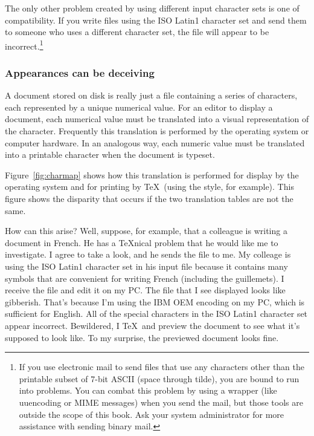 The only other problem created by using different input character sets is one
of compatibility.  If you write files using the ISO Latin1 character set and
send
them to someone who uses a different character set, the 
file will appear to be incorrect.\footnote{If you use electronic mail 
to send files that use any 
characters other than the printable subset of 7-bit ASCII (space through
tilde),
you are bound to run into problems.  You can combat
this problem by using a wrapper (like uuencoding or MIME messages) when you
send the mail, but those tools are outside the scope of this book.  Ask your
system administrator for more assistance with sending binary mail.}  

\subsubsection{Appearances can be deceiving}

A document stored on disk is really just a file containing a series of
characters, each represented by a unique numerical value.  For
an editor to display a document, each numerical value must
be translated into a visual representation of the character.  Frequently
this translation is performed by the operating system or computer hardware.
In an analogous way, each numeric value must be translated into a printable
character when the document is typeset.

Figure~\ref{fig:charmap} shows how this translation is performed for
display by the operating system and for printing by \TeX\ (using the
 style, for example).  This figure shows the disparity
that occurs if the two translation tables are not the same.


How can this arise?  Well, suppose, for example, that a colleague is
writing a document in French.  He 
has a \TeX{}nical problem that he
would like me to investigate.  I agree to take a look, and he sends the
file to me.  My colleage is using the ISO Latin1 character set in his
input file because it contains many symbols that are convenient for
writing French (including the guillemets).  I receive the file and
edit it on my PC.  The file that I see displayed looks like gibberish.
That's because I'm using the IBM OEM encoding on my PC, which
is sufficient for English.  All of the special characters in the
ISO Latin1 character set appear incorrect.  Bewildered, I \TeX\ and
preview the document to see what it's supposed to look like.  To my
surprise, the previewed document looks fine.


